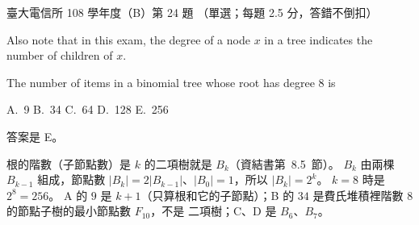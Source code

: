 \begin{pastexam}[label={px:ntu-108-comm-dsab-24}]{臺大電信所 108 學年度（B）第 24 題}
（單選；每題 2.5 分，答錯不倒扣）

Also note that in this exam, the degree of a node $x$ in a tree indicates the number of children
of $x$.

The number of items in a binomial tree whose root has degree 8 is

A.~9 \qquad B.~34 \qquad C.~64 \qquad D.~128 \qquad E.~256
\end{pastexam}

\begin{pastsoln}
答案是 E。

根的階數（子節點數）是 $k$ 的二項樹就是 $B_k$（資結書第~8.5~節）。 $B_k$ 由兩棵 $B_{k-1}$ 組成，節點數
$|B_k| = 2|B_{k-1}|$、$|B_0| = 1$，所以 $|B_k| = 2^k$。 $k = 8$ 時是 $2^8 = 256$。 A 的 $9$ 是
$k + 1$（只算根和它的子節點）；B 的 $34$ 是費氏堆積裡階數 $8$ 的節點子樹的最小節點數 $F_{10}$，不是
二項樹；C、D 是 $B_6$、$B_7$。
\end{pastsoln}
